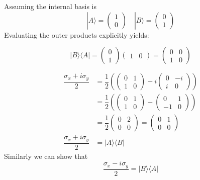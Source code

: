 \documentclass[11pt, a4paper]{article}
\begin{document}
Assuming the internal basis is
\begin{equation*}
    |A\rangle = \begin{pmatrix}
        1 \\ 0
    \end{pmatrix} \quad 
    |B\rangle = \begin{pmatrix}
        0 \\ 1
    \end{pmatrix}
\end{equation*}
Evaluating the outer products explicitly yields:

\begin{equation*}
    |B\rangle\langle A| = \begin{pmatrix}
        0 \\ 1
    \end{pmatrix} \begin{pmatrix}
        1 & 0
    \end{pmatrix} = \begin{pmatrix}
        0 &0 \\
        1 &0
    \end{pmatrix}
\end{equation*}

\begin{align*}
    \dfrac{\sigma_x + i \sigma_y}{2} &= \dfrac{1}{2} \left(
    \begin{pmatrix}
        0 &1 \\
        1 &0
    \end{pmatrix} + i \begin{pmatrix}
        0 & -i \\
        i & 0
    \end{pmatrix} \right)\\ &= \dfrac{1}{2} \left( \begin{pmatrix}
        0 & 1 \\ 1 &0
    \end{pmatrix} + \begin{pmatrix}
        0&1 \\
        -1&0
    \end{pmatrix} \right) \\ &= \dfrac{1}{2} \begin{pmatrix}
        0&2 \\ 0&0
    \end{pmatrix} = \begin{pmatrix}
        0&1 \\ 0&0
    \end{pmatrix} \\
    \dfrac{\sigma_x + i \sigma_y}{2} &= |A\rangle\langle B|
\end{align*}
Similarly we can show that 
\begin{equation*}
    \dfrac{\sigma_x - i \sigma_y}{2} = |B\rangle\langle A|
\end{equation*}
\end{document}
